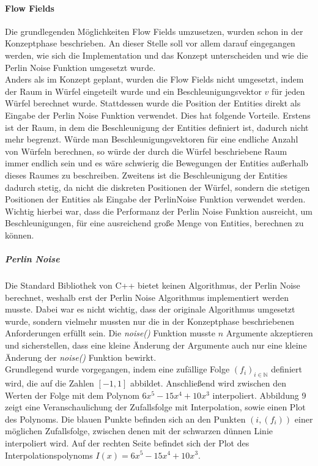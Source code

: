 \documentclass[11pt,a4paper]{article}
\begin{document}
\paragraph{Flow Fields}
Die grundlegenden Möglichkeiten Flow Fields umzusetzen, wurden schon in der Konzeptphase beschrieben. An dieser Stelle soll vor allem darauf eingegangen werden, wie sich die Implementation und das Konzept unterscheiden und wie die Perlin Noise Funktion umgesetzt wurde.\\
Anders als im Konzept geplant, wurden die Flow Fields nicht umgesetzt, indem der Raum in Würfel eingeteilt wurde und ein Beschleunigungsvektor $v$ für jeden Würfel berechnet wurde. Stattdessen wurde die Position der Entities direkt als Eingabe der Perlin Noise Funktion verwendet. Dies hat folgende Vorteile. Erstens ist der Raum, in dem die Beschleunigung der Entities definiert ist, dadurch nicht mehr begrenzt. Würde man Beschleunigungsvektoren für eine endliche Anzahl von Würfeln berechnen, so würde der durch die Würfel beschriebene Raum immer endlich sein und es wäre schwierig die Bewegungen der Entities außerhalb dieses Raumes zu beschreiben. Zweitens ist die Beschleunigung der Entities dadurch stetig, da nicht die diskreten Positionen der Würfel, sondern die stetigen Positionen der Entities als Eingabe der PerlinNoise Funktion verwendet werden. Wichtig hierbei war, dass die Performanz der Perlin Noise Funktion ausreicht, um Beschleunigungen, für eine ausreichend große Menge von Entities, berechnen zu können.
\subparagraph{Perlin Noise}
Die Standard Bibliothek von C++ bietet keinen Algorithmus, der Perlin Noise berechnet, weshalb erst der Perlin Noise Algorithmus implementiert werden musste. Dabei war es nicht wichtig, dass der originale Algorithmus umgesetzt wurde, sondern vielmehr mussten nur die in der Konzeptphase beschriebenen Anforderungen erfüllt sein. Die \textit{noise()} Funktion musste $n$ Argumente akzeptieren und sicherstellen, dass eine kleine Änderung der Argumente auch nur eine kleine Änderung der \textit{noise()} Funktion bewirkt.\\
Grundlegend wurde vorgegangen, indem eine zufällige Folge $\left(f_i\right)_{i \in \mathbb{N}}$ definiert wird, die auf die Zahlen $[-1, 1]$ abbildet.
Anschließend wird zwischen den Werten der Folge mit dem Polynom $6x^5-15x^4+10x^3$ interpoliert. Abbildung 9 zeigt eine Veranschaulichung der Zufallsfolge mit Interpolation, sowie einen Plot des Polynoms. Die blauen Punkte befinden sich an den Punkten $\left(i, \left(f_i\right)\right)$ einer möglichen Zufallsfolge, zwischen denen mit der schwarzen dünnen Linie interpoliert wird. Auf der rechten Seite befindet sich der Plot des Interpolationspolynoms $I(x) = 6x^5-15x^4+10x^3$.
\end{document}
